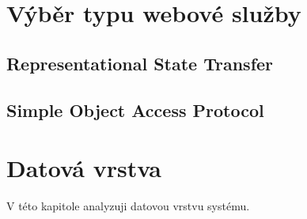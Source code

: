 \documentclass{diplomka}
\begin{document}
\section{Výběr typu webové služby}

\subsection{Representational State Transfer}

\subsection{Simple Object Access Protocol}

\section{Datová vrstva}
V této kapitole analyzuji datovou vrstvu systému. 
\end{document}
